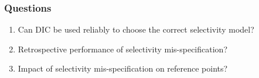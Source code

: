 \documentclass[table]{beamer}
\begin{document}
\begin{frame}[m]\frametitle{Questions}
    \begin{enumerate}
    	\item Can DIC be used reliably to choose the correct selectivity model?
    	\item Retrospective performance of selectivity mis-specification?
    	\item Impact of selectivity mis-specification on reference points?
    \end{enumerate}
\end{frame}


\end{document}
